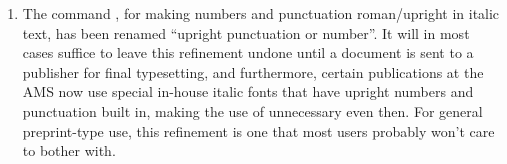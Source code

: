 \documentclass{amsdtx}
\begin{document}
\begin{enumerate}
\item The command , for making numbers and punctuation
roman/upright in italic text, has been renamed  ``upright
punctuation or number''. It will in most cases suffice to leave this
refinement undone until a document is sent to a publisher for final
typesetting, and furthermore, certain publications at the AMS now use
special in-house italic fonts that have upright numbers and punctuation
built in, making the use of  unnecessary even then. For general
preprint-type use, this refinement is one that most users probably won't
care to bother with.

\end{enumerate}
\end{document}
